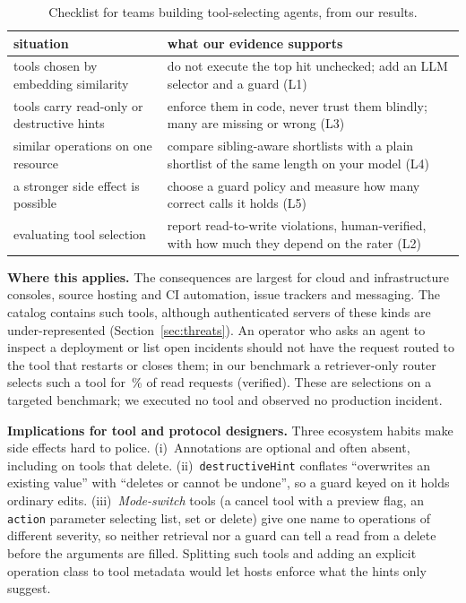 \begin{table}[t]\centering
\caption{Checklist for teams building tool-selecting agents, from our results.}\label{tab:checklist}
\scriptsize\setlength{\tabcolsep}{3pt}
\begin{tabular}{p{}p{}}\toprule
situation & what our evidence supports\\\midrule
tools chosen by embedding similarity & do not execute the top hit unchecked; add an LLM selector and a guard (L1)\\
tools carry read-only or destructive hints & enforce them in code, never trust them blindly; many are missing or wrong (L3)\\
similar operations on one resource & compare sibling-aware shortlists with a plain shortlist of the same length on your model (L4)\\
a stronger side effect is possible & choose a guard policy and measure how many correct calls it holds (L5)\\
evaluating tool selection & report read-to-write violations, human-verified, with how much they depend on the rater (L2)\\
\bottomrule\end{tabular}\end{table}

\textbf{Where this applies.} The consequences are largest for cloud and infrastructure consoles,
source hosting and CI automation, issue trackers and messaging. The catalog contains such tools,
although authenticated servers of these kinds are under-represented (Section~\ref{sec:threats}). An operator who asks an agent to inspect a deployment or list open
incidents should not have the request routed to the tool that restarts or closes them; in our benchmark a
retriever-only router selects such a tool for \RWRetRate\,\% of read requests (verified). These are
selections on a targeted benchmark; we executed no tool and observed no production incident.

\textbf{Implications for tool and protocol designers.} Three ecosystem habits make side effects
hard to police. (i)~Annotations are optional and often absent, including on tools that
delete. (ii)~\texttt{destructiveHint} conflates ``overwrites an existing value'' with ``deletes
or cannot be undone'', so a guard keyed on it holds ordinary edits. (iii)~\emph{Mode-switch} tools
(a cancel tool with a preview flag, an \texttt{action} parameter selecting list, set or delete)
give one name to operations of different severity, so neither retrieval nor a guard can tell a
read from a delete before the arguments are filled. Splitting such tools and adding an explicit
operation class to tool metadata would let hosts enforce what the hints only suggest.
